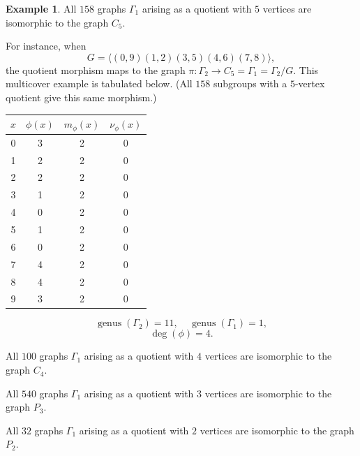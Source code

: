 \documentclass[12pt,letterpaper]{article}
\theoremstyle{definition}
\newtheorem{example}[theorem]{Example}
\DeclareMathOperator{\genus}{genus}
\begin{document}
\begin{example}
{All $158$ graphs $\Gamma_1$ arising as a quotient with
$5$ vertices are isomorphic to the graph $C_5$.

For instance, when
\[
G = \langle  (0,9)(1,2)(3,5)(4,6)(7,8) \rangle ,
\]
the quotient morphism maps to the  graph
$\pi: \Gamma_2\to C_5=\Gamma_1=\Gamma_2/G $.
This multicover example is tabulated below. (All $158$ subgroups with a
$5$-vertex quotient give this same morphism.)

\begin{center}
\begin{tabular}{c|c|c|c}  
  $x$ & $\phi(x)$ & $m_\phi(x)$ & $\nu_\phi(x)$ \\ \hline
  0   &    3   &        2         &  0   \\ 
  1   &    2   &        2         &  0  \\ 
  2   &    2   &        2         &  0  \\ 
  3   &    1   &        2         &  0  \\ 
  4   &    0   &        2         &  0   \\
  5   &    1   &        2         &  0   \\
  6   &    0   &        2         &  0   \\
  7   &    4   &        2         &  0   \\
  8   &    4   &        2         &  0   \\
  9   &    3   &        2         &  0   \\     
\end{tabular}
\end{center}

\[
  \genus(\Gamma_2) =11,\ \ \ \ \
  \genus(\Gamma_1) =1,
\]
\[
\deg(\phi) =4.
\]


All $100$ graphs $\Gamma_1$ arising as a quotient with
$4$ vertices are isomorphic to the graph $C_4$.

All $540$ graphs $\Gamma_1$ arising as a quotient with
$3$ vertices are isomorphic to the graph $P_3$.

All $32$ graphs $\Gamma_1$ arising as a quotient with
$2$ vertices are isomorphic to the graph $P_2$.


}
\end{example}
\end{document}
